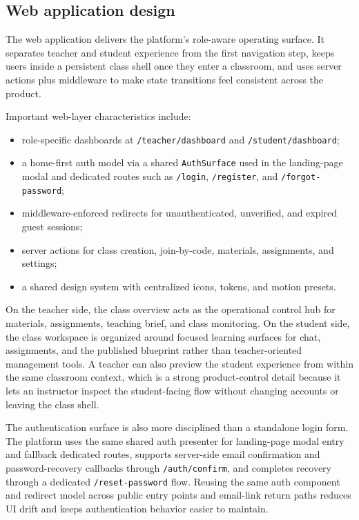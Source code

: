 \documentclass[11pt,a4paper]{article}
\begin{document}
\subsection{Web application design}

The web application delivers the platform's role-aware operating surface. It separates teacher and
student experience from the first navigation step, keeps users inside a persistent class shell once
they enter a classroom, and uses server actions plus middleware to make state transitions feel
consistent across the product.

Important web-layer characteristics include:
\begin{itemize}
  \item role-specific dashboards at \texttt{/teacher/dashboard} and \texttt{/student/dashboard};
  \item a home-first auth model via a shared \texttt{AuthSurface} used in the landing-page modal
  and dedicated routes such as \texttt{/login}, \texttt{/register}, and \texttt{/forgot-password};
  \item middleware-enforced redirects for unauthenticated, unverified, and expired guest sessions;
  \item server actions for class creation, join-by-code, materials, assignments, and settings;
  \item a shared design system with centralized icons, tokens, and motion presets.
\end{itemize}

On the teacher side, the class overview acts as the operational control hub for materials,
assignments, teaching brief, and class monitoring. On the student side, the class workspace is
organized around focused learning surfaces for chat, assignments, and the published blueprint
rather than teacher-oriented management tools. A teacher can also preview the student experience
from within the same classroom context, which is a strong product-control detail because it lets an
instructor inspect the student-facing flow without changing accounts or leaving the class shell.

The authentication surface is also more disciplined than a standalone login form. The platform uses
the same shared auth presenter for landing-page modal entry and fallback dedicated routes, supports
server-side email confirmation and password-recovery callbacks through \texttt{/auth/confirm}, and
completes recovery through a dedicated \texttt{/reset-password} flow. Reusing the same auth
component and redirect model across public entry points and email-link return paths reduces UI drift
and keeps authentication behavior easier to maintain.
\end{document}
